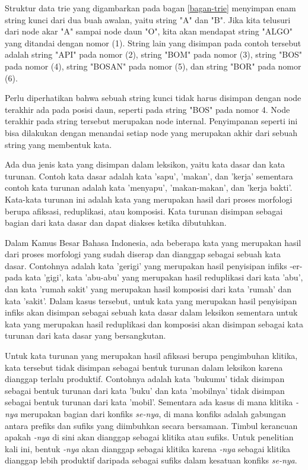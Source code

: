 Struktur data trie yang digambarkan pada bagan \ref{bagan-trie} menyimpan enam string kunci dari dua buah awalan, yaitu string "A" dan "B". Jika kita telusuri dari node akar "A" sampai node daun "O", kita akan mendapat string "ALGO" yang ditandai dengan nomor (1). String lain yang disimpan pada contoh tersebut adalah string "API" pada nomor (2), string "BOM" pada nomor (3), string "BOS" pada nomor (4), string "BOSAN" pada nomor (5), dan string "BOR" pada nomor (6).

Perlu diperhatikan bahwa sebuah string kunci tidak harus disimpan dengan node terakhir ada pada posisi daun, seperti pada string "BOS" pada nomor 4. Node terakhir pada string tersebut merupakan node internal. Penyimpanan seperti ini bisa dilakukan dengan menandai setiap node yang merupakan akhir dari sebuah string yang membentuk kata.

Ada dua jenis kata yang disimpan dalam leksikon, yaitu kata dasar dan kata turunan. Contoh kata dasar adalah kata 'sapu', 'makan', dan 'kerja' sementara contoh kata turunan adalah kata 'menyapu', 'makan-makan', dan 'kerja bakti'. Kata-kata turunan ini adalah kata yang merupakan hasil dari proses morfologi berupa afiksasi, reduplikasi, atau komposisi. Kata turunan disimpan sebagai bagian dari kata dasar dan dapat diakses ketika dibutuhkan. 

Dalam Kamus Besar Bahasa Indonesia, ada beberapa kata yang merupakan hasil dari proses morfologi yang sudah diserap dan dianggap sebagai sebuah kata dasar. Contohnya adalah kata 'gerigi' yang merupakan hasil penyisipan infiks -er- pada kata 'gigi', kata 'abu-abu' yang merupakan hasil reduplikasi dari kata 'abu', dan kata 'rumah sakit' yang merupakan hasil komposisi dari kata 'rumah' dan kata 'sakit'. Dalam kasus tersebut, untuk kata yang merupakan hasil penyisipan infiks akan disimpan sebagai sebuah kata dasar dalam leksikon sementara untuk kata yang merupakan hasil reduplikasi dan komposisi akan disimpan sebagai kata turunan dari kata dasar yang bersangkutan.

Untuk kata turunan yang merupakan hasil afiksasi berupa pengimbuhan klitika, kata tersebut tidak disimpan sebagai bentuk turunan dalam leksikon karena dianggap terlalu produktif. Contohnya adalah kata 'bukumu' tidak disimpan sebagai bentuk turunan dari kata 'buku' dan kata 'mobilnya' tidak disimpan sebagai bentuk turunan dari kata 'mobil'. Sementara ada kasus di mana klitika \textit{-nya} merupakan bagian dari konfiks \textit{se-nya}, di mana konfiks adalah gabungan antara prefiks dan sufiks yang diimbuhkan secara bersamaan. Timbul kerancuan apakah \textit{-nya} di sini akan dianggap sebagai klitika atau sufiks. Untuk penelitian kali ini, bentuk \textit{-nya} akan dianggap sebagai klitika karena \textit{-nya} sebagai klitika dianggap lebih produktif daripada sebagai sufiks dalam kesatuan konfiks \textit{se-nya}.

